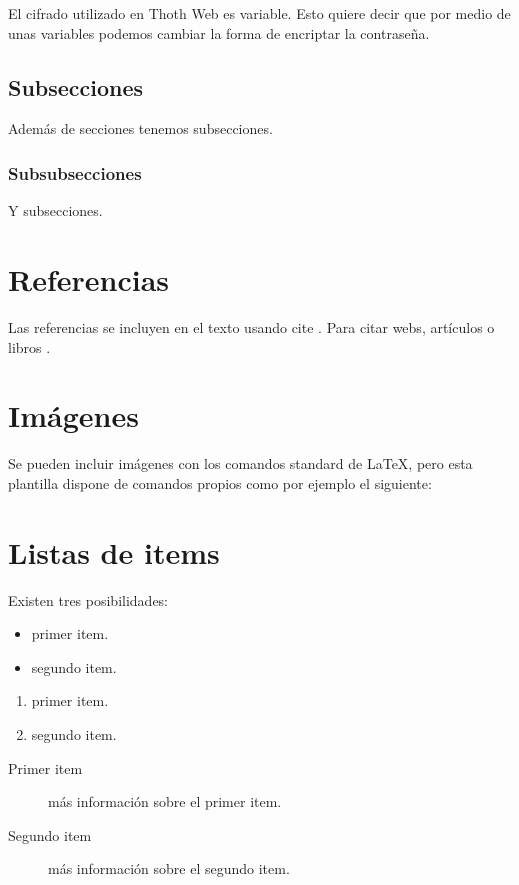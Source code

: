 El cifrado utilizado en Thoth Web es variable. Esto quiere decir que por medio de unas variables podemos cambiar la forma de encriptar la contraseña. 

\subsection{Subsecciones}

Además de secciones tenemos subsecciones.

\subsubsection{Subsubsecciones}

Y subsecciones. 


\section{Referencias}

Las referencias se incluyen en el texto usando cite \cite{wiki:latex}. Para citar webs, artículos o libros \cite{koza92}.


\section{Imágenes}

Se pueden incluir imágenes con los comandos standard de \LaTeX, pero esta plantilla dispone de comandos propios como por ejemplo el siguiente:




\section{Listas de items}

Existen tres posibilidades:

\begin{itemize}
	\item primer item.
	\item segundo item.
\end{itemize}

\begin{enumerate}
	\item primer item.
	\item segundo item.
\end{enumerate}

\begin{description}
	\item[Primer item] más información sobre el primer item.
	\item[Segundo item] más información sobre el segundo item.
\end{description}
	
